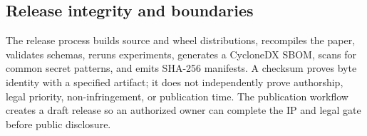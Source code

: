 \subsection{Release integrity and boundaries}

The release process builds source and wheel distributions, recompiles the paper, validates schemas, reruns experiments, generates a CycloneDX SBOM, scans for common secret patterns, and emits SHA-256 manifests. A checksum proves byte identity with a specified artifact; it does not independently prove authorship, legal priority, non-infringement, or publication time. The publication workflow creates a draft release so an authorized owner can complete the IP and legal gate before public disclosure.
